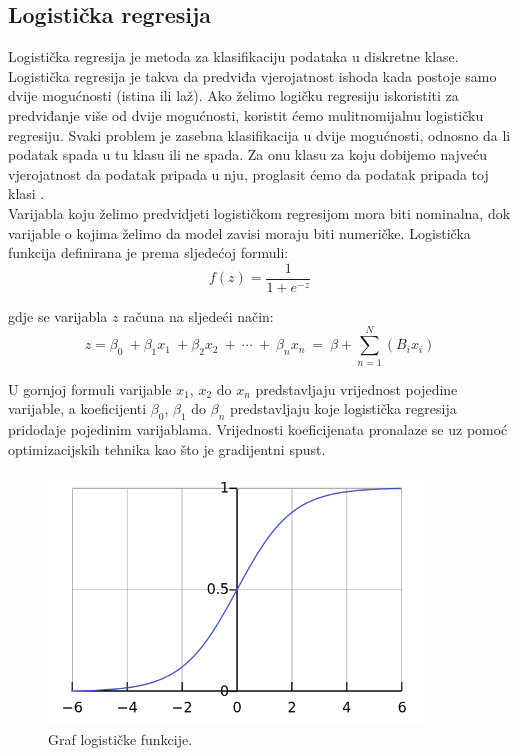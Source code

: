 \documentclass[times,utf8,zavrsni]{fer}
\begin{document}
\subsection{Logistička regresija}
Logistička regresija je metoda za klasifikaciju podataka u diskretne klase. Logistička regresija je takva da predviđa vjerojatnost ishoda kada postoje samo dvije mogućnosti (istina ili laž). Ako želimo logičku regresiju iskoristiti za predviđanje više od dvije mogućnosti, koristit ćemo mulitnomijalnu logističku regresiju. Svaki problem je zasebna klasifikacija u dvije mogućnosti, odnosno da li podatak spada u tu klasu ili ne spada. Za onu klasu za koju dobijemo najveću vjerojatnost da podatak pripada u nju, proglasit ćemo da podatak pripada toj klasi \citep{regression}. \\

Varijabla koju želimo predvidjeti logističkom regresijom mora biti nominalna, dok varijable o kojima želimo da model zavisi moraju biti numeričke. Logistička funkcija definirana je prema sljedećoj formuli:
\begin{equation}
\label{logiFun}
f\left(z\right)=\frac{1}{1+e^{-z}}
\end{equation}


\noindent gdje se varijabla $z$ računa na sljedeći način: \\
\begin{equation}
\label{logiZ}
z=\beta_{0}\:+\beta_{1}x_{1}\:+\beta_{2}x_{2}\:+\:\cdots\:+\:\beta_{n}x_{n}\:=\:\beta +\sum _{n=1}^N\left(B_{i}x_{i}\right)
\end{equation}

\noindent U gornjoj formuli varijable $x_{1}$, $x_{2}$ do $x_{n}$ predstavljaju vrijednost pojedine varijable, a koeficijenti $\beta_{0}$, $\beta_{1}$ do $\beta_{n}$ predstavljaju koje logistička regresija pridodaje pojedinim varijablama. Vrijednosti koeficijenata pronalaze se uz pomoć optimizacijskih tehnika kao što je gradijentni spust.

\begin{figure}[]
	\centering
	\includegraphics[width=10cm]{img/logistic.png}
	\caption{Graf logističke funkcije.\protect\footnotemark }
	\label{fig:logistic}
\end{figure}
\end{document}
